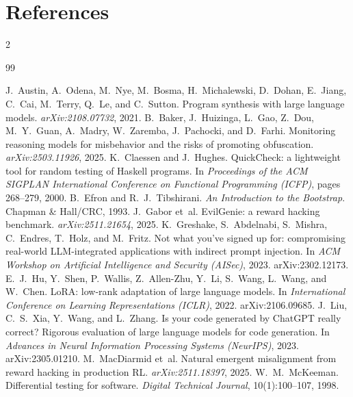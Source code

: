 \documentclass[11pt]{article}
\begin{document}
\section*{References}
\renewcommand{\bibsection}{}
\begin{multicols}{2}
\begin{thebibliography}{99}\scriptsize\setlength{\bibsep}{1pt}\raggedright{}
\setlength{\itemsep}{2pt}
 J.~Austin, A.~Odena, M.~Nye, M.~Bosma, H.~Michalewski, D.~Dohan, E.~Jiang, C.~Cai, M.~Terry, Q.~Le, and C.~Sutton. Program synthesis with large language models. \emph{arXiv:2108.07732}, 2021.
 B.~Baker, J.~Huizinga, L.~Gao, Z.~Dou, M.~Y.~Guan, A.~Madry, W.~Zaremba, J.~Pachocki, and D.~Farhi. Monitoring reasoning models for misbehavior and the risks of promoting obfuscation. \emph{arXiv:2503.11926}, 2025.
 K.~Claessen and J.~Hughes. QuickCheck: a lightweight tool for random testing of Haskell programs. In \emph{Proceedings of the ACM SIGPLAN International Conference on Functional Programming (ICFP)}, pages 268--279, 2000.
 B.~Efron and R.~J.~Tibshirani. \emph{An Introduction to the Bootstrap}. Chapman \& Hall/CRC, 1993.
 J.~Gabor et~al. EvilGenie: a reward hacking benchmark. \emph{arXiv:2511.21654}, 2025.
 K.~Greshake, S.~Abdelnabi, S.~Mishra, C.~Endres, T.~Holz, and M.~Fritz. Not what you've signed up for: compromising real-world LLM-integrated applications with indirect prompt injection. In \emph{ACM Workshop on Artificial Intelligence and Security (AISec)}, 2023. arXiv:2302.12173.
 E.~J.~Hu, Y.~Shen, P.~Wallis, Z.~Allen-Zhu, Y.~Li, S.~Wang, L.~Wang, and W.~Chen. LoRA: low-rank adaptation of large language models. In \emph{International Conference on Learning Representations (ICLR)}, 2022. arXiv:2106.09685.
 J.~Liu, C.~S.~Xia, Y.~Wang, and L.~Zhang. Is your code generated by ChatGPT really correct? Rigorous evaluation of large language models for code generation. In \emph{Advances in Neural Information Processing Systems (NeurIPS)}, 2023. arXiv:2305.01210.
 M.~MacDiarmid et~al. Natural emergent misalignment from reward hacking in production RL. \emph{arXiv:2511.18397}, 2025.
 W.~M.~McKeeman. Differential testing for software. \emph{Digital Technical Journal}, 10(1):100--107, 1998.

\end{thebibliography}
\end{multicols}
\end{document}
